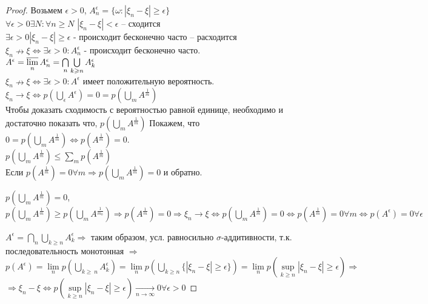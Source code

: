 \begin{proof}
Возьмем $\epsilon > 0$, $A^{\epsilon}_{n} = \{\omega : |\xi_{n} - \xi|\geqslant \epsilon\}$\\
$\forall \epsilon>0 \exists N: \forall n\geqslant N$  $|\xi_{n}-\xi|<\epsilon$ -- сходится\\
$\exists \epsilon > 0 |\xi_{n} - \xi|\geqslant \epsilon$ - происходит бесконечно часто -- расходится\\
$\xi_{n}\nrightarrow \xi \Leftrightarrow \exists \epsilon >0: A_{n}^{\epsilon}$ - происходит бесконечно часто.\\
$A^{\epsilon} = \varlimsup\limits_{n} A_{n}^{\epsilon} = \bigcap\limits_{n} \bigcup\limits_{k\geqslant n} A_{k}^{\epsilon}$\\
$\xi_{n}\nrightarrow \xi \Leftrightarrow \exists \epsilon >0: A^{\epsilon}$ имеет положительную вероятность.\\
$\xi_{n}\rightarrow \xi \Leftrightarrow p\left(\bigcup\limits_{\epsilon}A^{\epsilon}\right) = 0 = p\left(\bigcup\limits_{m}A^{\frac{1}{m}}\right)$\\
Чтобы доказать сходимость с вероятностью равной единице, необходимо и достаточно показать что, $p\left(\bigcup\limits_{m}A^{\frac{1}{m}}\right)$
Покажем, что $0=p\left(\bigcup\limits_{m}A^{\frac{1}{m}}\right)\Leftrightarrow p\left(A^{\frac{1}{m}}\right)=0$.\\
$p(\bigcup\limits_{m}A^{\frac{1}{m}}) \leqslant \sum\limits_{m}p(A^{\frac{1}{m}})$\\
Если $p(A^{\frac{1}{m}})=0 \forall m \Rightarrow p\left(\bigcup\limits_{m}A^{\frac{1}{m}}\right)=0$ и обратно.

$p\left(\bigcup\limits_{m}A^{\frac{1}{m}}\right)=0$, $p\left(\bigcup\limits_{m}A^{\frac{1}{m}}\right)\geqslant p\left(\bigcup\limits_{m}A^{\frac{1}{m_{0}}}\right) \Rightarrow p\left(A^{\frac{1}{m}}\right)=0 \Rightarrow \xi_{n}\rightarrow\xi \Leftrightarrow p\left(\bigcup\limits_{m}A^{\frac{1}{m}}\right)=0 \Leftrightarrow p\left(A^{\frac{1}{m}}\right)=0 \forall m \Leftrightarrow p(A^{\epsilon})=0 \forall \epsilon$

$A^{\epsilon}=\bigcap\limits_{n}\bigcup\limits_{k\geqslant n} A_{k}^{\epsilon} \Rightarrow $ таким образом, усл. равносильно $\sigma$-аддитивности, т.к. последовательность монотонная $\Rightarrow$\\
$p(A^{\epsilon})=
\lim\limits_{n} p\left(\bigcup\limits_{k\geqslant\ n} A_{k}^{\epsilon}\right) =
\lim\limits_{n} p\left(\bigcup\limits_{k \geqslant n} \{|\xi_{n}-\xi|\geqslant \epsilon \}\right) =
\lim\limits_{n} p(\sup\limits_{k\geqslant n}|\xi_{n}-\xi| \geqslant \epsilon) \Rightarrow$\\
$\Rightarrow \xi_{n}-\xi \Leftrightarrow p\left(\sup\limits_{k\geqslant n} |\xi_{n}-\xi|\geqslant \epsilon\right) \xrightarrow[n \rightarrow
\infty]{} 0 \forall \epsilon > 0$
\end{proof}

